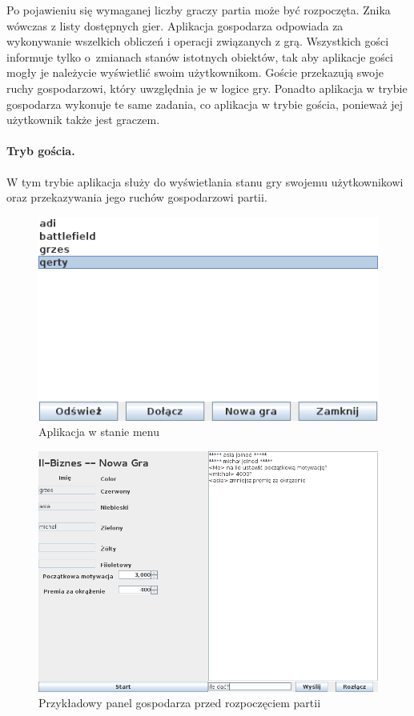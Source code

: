 \documentclass[a4paper, 12pt]{article}
\begin{document}
Po pojawieniu się wymaganej liczby graczy partia może być rozpoczęta. Znika wówczas z listy dostępnych gier. Aplikacja gospodarza odpowiada za wykonywanie wszelkich obliczeń i operacji związanych z grą. Wszystkich gości informuje tylko o~zmianach stanów istotnych obiektów, tak aby aplikacje gości mogły je należycie wyświetlić swoim użytkownikom. Goście przekazują swoje ruchy gospodarzowi, który uwzględnia je w logice gry. Ponadto aplikacja w trybie gospodarza wykonuje te same zadania, co aplikacja w trybie gościa, ponieważ jej użytkownik także jest graczem.

\paragraph{Tryb gościa.} W tym trybie aplikacja służy do wyświetlania stanu gry swojemu użytkownikowi oraz przekazywania jego ruchów gospodarzowi partii.


\begin{figure}
\centering
\includegraphics[scale=0.8]{rysunki/menu.png}
\caption{Aplikacja w stanie menu}
\label{fig:menu}
\end{figure}


\begin{figure}
\centering
\includegraphics[scale=0.8]{rysunki/inicjacja.png}
\caption{Przykładowy panel gospodarza przed rozpoczęciem partii}
\label{fig:inicjacja}
\end{figure}
\vspace{2cm}
\end{document}
